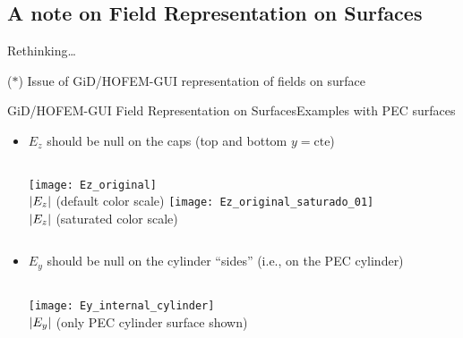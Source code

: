 \subsection{A note on Field Representation on Surfaces}

\begin{frame}[plain]
  \centering    \Large{Rethinking\ldots}
  
  {\footnotesize \alert{($\ast$)} Issue of GiD/HOFEM-GUI representation of fields on surface}
  
\end{frame}

  
\begin{frame}[allowframebreaks]{GiD/HOFEM-GUI Field Representation 
    on Surfaces}{Examples with PEC surfaces}

  \begin{itemize}
  \item $E_z$ should be null on the  caps (top and
    bottom $y=\text{cte}$)

    \vbs
   
    \begin{columns}%
      \centering
      \centering
      \texttt{[image: Ez\_original]} \\
      \footnotesize{$\left\lvert E_z\right\rvert$ (default color scale)}
      \centering
      \texttt{[image: Ez\_original\_saturado\_01]} \\
      \footnotesize{$\left\lvert E_z\right\rvert$ (saturated color scale)}
    \end{columns}
    

    \framebreak %

  \item $E_y$ should be null on the cylinder ``sides'' (i.e., on the
    PEC cylinder)

    \vbss
   
    \begin{center}
     \begin{columns}%
      \centering
      \texttt{[image: Ey\_internal\_cylinder]} \\
      \footnotesize{$\left\lvert E_y\right\rvert$ (only PEC cylinder surface shown)}
    \end{columns}
  \end{center}
  \end{itemize}
\end{frame}

